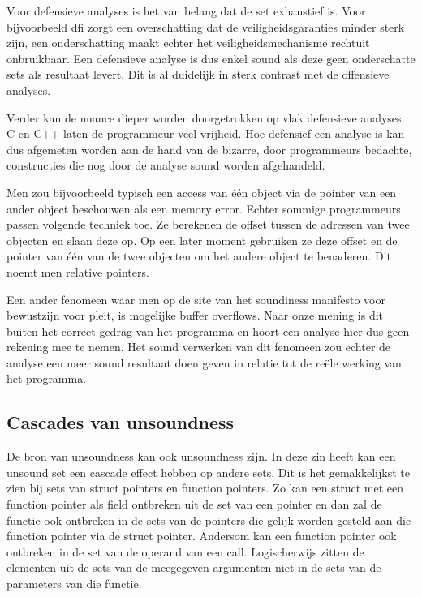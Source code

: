 \documentclass[conference]{IEEEtran}
\begin{document}
Voor defensieve analyses is het van belang dat de set exhaustief is. Voor bijvoorbeeld \gls{dfi} zorgt een overschatting dat de veiligheidsgaranties minder sterk zijn, een onderschatting maakt echter het veiligheidsmechanisme rechtuit onbruikbaar. Een defensieve analyse is dus enkel sound als deze geen onderschatte sets als resultaat levert. Dit is al duidelijk in sterk contrast met de offensieve analyses. 

Verder kan de nuance dieper worden doorgetrokken op vlak defensieve analyses. C en C++ laten de programmeur veel vrijheid. Hoe defensief een analyse is kan dus afgemeten worden aan de hand van de bizarre, door programmeurs bedachte, constructies die nog door de analyse sound worden afgehandeld. 

Men zou bijvoorbeeld typisch een access van één object via de pointer van een ander object beschouwen als een memory error. Echter sommige programmeurs passen volgende techniek toe. Ze berekenen de offset tussen de adressen van twee objecten en slaan deze op. Op een later moment gebruiken ze deze offset en de pointer van één van de twee objecten om het andere object te benaderen. Dit noemt men relative pointers. 

Een ander fenomeen waar men op de site van het soundiness manifesto\cite{noauthor_soundiness_nodate} voor bewustzijn voor pleit, is mogelijke buffer overflows. Naar onze mening is dit buiten het correct gedrag van het programma en hoort een analyse hier dus geen rekening mee te nemen. Het sound verwerken van dit fenomeen zou echter de analyse een meer sound resultaat doen geven in relatie tot de reële werking van het programma. 

\subsection{Cascades van unsoundness}

De bron van unsoundness kan ook unsoundness zijn. In deze zin heeft kan een unsound set een cascade effect hebben op andere sets. Dit is het gemakkelijkst te zien bij sets van struct pointers en function pointers. Zo kan een struct met een function pointer als field ontbreken uit de set van een pointer en dan zal de functie ook ontbreken in de sets van de pointers die gelijk worden gesteld aan die function pointer via de struct pointer. Andersom kan een function pointer ook ontbreken in de set van de operand van een call. Logischerwijs zitten de elementen uit de sets van de meegegeven argumenten niet in de sets van de parameters van die functie. 
\end{document}
